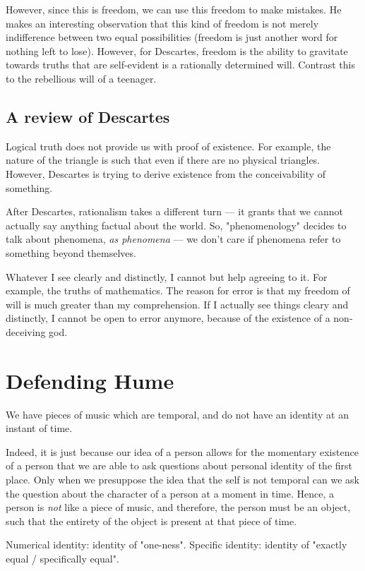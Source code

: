 \documentclass[11pt]{book}
\begin{document}
However, since this is freedom, we can use this freedom to make mistakes.
He makes an interesting observation that this kind of freedom is not merely indifference
between two equal possibilities (freedom is just another word for nothing left to lose).
However, for Descartes, freedom is the ability to gravitate towards truths that
are self-evident is a rationally determined will. Contrast this to the rebellious
will of a teenager.

\section{A review of Descartes}

Logical truth does not provide us with proof of existence. For example, the
nature of the triangle is such that even if there are no physical triangles.
However, Descartes is trying to derive existence from the conceivability of
something.

After Descartes, rationalism takes a different turn --- it grants that we
cannot actually say anything factual about the world. So, "phenomenology"
decides to talk about phenomena, \textit{as phenomena} --- we don't care
if phenomena refer to something beyond themselves.

Whatever I see clearly and distinctly, I cannot but help agreeing to it. For
example, the truths of mathematics. The reason for error is that my freedom of
will is much greater than my comprehension. If I actually see things cleary and
distinctly, I cannot be open to error anymore, because of the existence of a
non-deceiving god.

\chapter{Defending Hume}

We have pieces of music which are temporal, and do not have an identity
at an instant of time.

Indeed, it is just because our idea of a person allows for the momentary
existence of a person that we are able to ask questions about personal identity
of the first place. Only when we presuppose the idea that the self is not temporal
can we ask the question about the character of a person at a moment in time.
Hence, a person is \emph{not} like a piece of music, and therefore, the
person must be an object, such that the entirety of the object is present
at that piece of time. 

Numerical identity: identity of "one-ness". Specific identity: identity
of "exactly equal / specifically equal".
\end{document}

